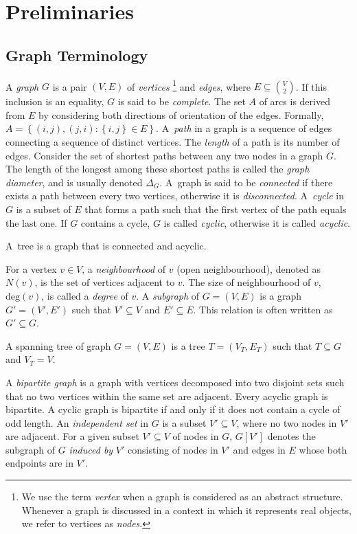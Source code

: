 \chapter{Preliminaries}\label{sec:back}

\section{Graph Terminology}\label{sec:back:graph}

A \emph{graph} $G$ is a pair $(V,E)$ of \emph{vertices}
\footnote{We use the term \emph{vertex} when a graph is considered as an abstract structure. 
Whenever a graph is discussed in a context in which it represents real objects, we refer to vertices as \emph{nodes}. 
}
and \emph{edges}, where $E\subseteq {{V}\choose{2}}$.
If this inclusion is an equality, $G$ is said to be \emph{complete}.
 The set $A$ of arcs is derived from $E$ by considering both directions of orientation of the edges.
 Formally, $A=\left\{(i,j),(j,i):\left\{i,j\right\}\in E\right\}$.
A~\emph{path} in a graph is a sequence of edges connecting a sequence of distinct vertices.
The \emph{length} of a path is its number of edges.
Consider the set of shortest paths between any two nodes in a graph $G$.
The length of the longest among these shortest paths is called the \emph{graph diameter}, and is usually denoted $\Delta_G$.
A~graph is said to be \emph{connected} if there exists a path between every two vertices, otherwise it is \emph{disconnected}.
A~\emph{cycle} in $G$ is a subset of $E$ that forms a path such that the first vertex of the path equals the last one. 
If $G$ contains a cycle, $G$ is called \emph{cyclic}, otherwise it is called \emph{acyclic}.
\begin{definition}
A~tree is a graph that is connected and acyclic.
\end{definition}
For a vertex $v\in V$, a \emph{neighbourhood} of $v$ (open neighbourhood), denoted as $N(v)$, is the set of vertices adjacent to $v$.
The size of neighbourhood of $v$, $\text{deg}(v)$, is called a \emph{degree} of $v$.
A \emph{subgraph} of $G=(V,E)$ is a graph $G'=(V',E')$ such that $V'\subseteq V$ and $E'\subseteq E$.
This relation is often written as $G'\subseteq G$.
\begin{definition}
A spanning tree of graph $G=(V,E)$ is a tree $T=(V_T,E_T)$ such that $T\subseteq G$ and $V_T=V$.
\end{definition}
A \emph{bipartite graph} is a graph with vertices decomposed into two disjoint sets such that no two vertices within the same set are adjacent.
Every acyclic graph is bipartite.
A cyclic graph is bipartite if and only if it does not contain a cycle of odd length.
An \emph{independent set} in $G$ is a subset $V'\subseteq V$, where no two nodes in $V'$ are adjacent.
For a given subset $V'\subseteq V$ of nodes in $G$, $G\left[V'\right]$ denotes the subgraph of $G$ \emph{induced by} $V'$ consisting of nodes in $V'$ and edges in $E$ whose both endpoints are in $V'$.

